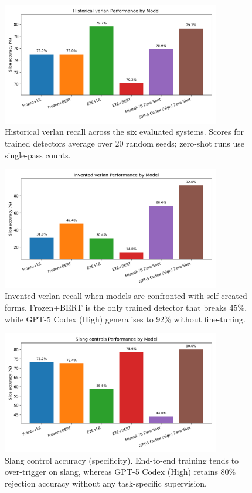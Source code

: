 \documentclass[12pt]{article}
\begin{document}
\begin{figure}[H]
    \centering
    \includegraphics[width=0.85\textwidth]{figures/historical_verlan_comparison.png}
    \caption{Historical verlan recall across the six evaluated systems.  Scores for trained detectors average over 20 random seeds; zero-shot runs use single-pass counts.}
    \label{fig:historical-verlan-comparison}
\end{figure}

\begin{figure}[H]
    \centering
    \includegraphics[width=0.85\textwidth]{figures/invented_verlan_comparison.png}
    \caption{Invented verlan recall when models are confronted with self-created forms.  Frozen+BERT is the only trained detector that breaks 45\%, while GPT-5 Codex (High) generalises to 92\% without fine-tuning.}
    \label{fig:invented-verlan-comparison}
\end{figure}

\begin{figure}[H]
    \centering
    \includegraphics[width=0.85\textwidth]{figures/slang_controls_comparison.png}
    \caption{Slang control accuracy (specificity).  End-to-end training tends to over-trigger on slang, whereas GPT-5 Codex (High) retains 80\% rejection accuracy without any task-specific supervision.}
    \label{fig:slang-comparison}
\end{figure}
\end{document}
